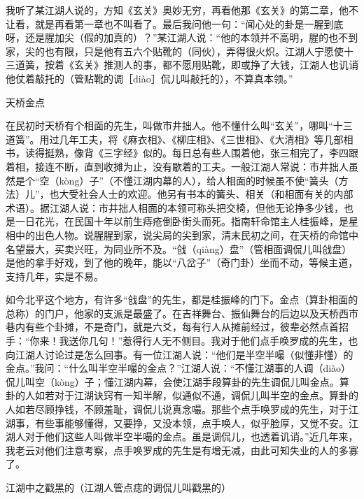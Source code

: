 \documentclass[12pt,UTF8]{ctexbook}
\begin{document}
我听了某江湖人说的，方知《玄关》奥妙无穷，再看他那《玄关》的第二章，他不让看，就是再看第一章也不叫看了。最后我问他一句：“闻心处的卦是一腥到底呀，还是腥加尖（假的加真的）？”某江湖人说：“他的本领并不高明，腥的也不到家，尖的也有限，只是他有五六个贴靴的（同伙），弄得很火炽。江湖人宁愿使十三道簧，按着《玄关》推测人的事，都不愿用贴靴，即或挣了大钱，江湖人也讥诮他仗着敲托的（管贴靴的调［diào］侃儿叫敲托的），不算真本领。”





天桥金点


在民初时天桥有个相面的先生，叫做市井拙人。他不懂什么叫“玄关”，哪叫“十三道簧”。用过几年工夫，将《麻衣相》、《柳庄相》、《三世相》、《大清相》等几部相书，读得挺熟，像背《三字经》似的。每日总有些人围着他，张三相完了，李四跟着相，接连不断，直到收摊为止，没有歇着的工夫。一般江湖人常说：市井拙人虽然是个“空（kòng）子”（不懂江湖内幕的人），给人相面的时候虽不使“簧头（方法）儿”，也大受社会人士的欢迎。他另有书本的簧头、相关（和相面有关的内部术语）。据江湖人说：市井拙人相面的本领可称头把交椅，但他无论挣多少钱，也是一日花光，在民国十年以前生痔疮倒卧街头而死。指南轩命馆主人桂振峰，是星相中的出色人物。说腥腥到家，说尖局的尖到家，清末民初之间，在天桥的命馆中名望最大，买卖兴旺，为同业所不及。“戗（qiàng）盘”（管相面调侃儿叫戗盘）是他的拿手好戏，到了他的晚年，能以“八岔子”（奇门卦）坐而不动，等候主道，支持几年，实是不易。

如今北平这个地方，有许多“戗盘”的先生，都是桂振峰的门下。金点（算卦相面的总称）的门户，他家的支派是最盛了。在吉祥舞台、振仙舞台的后边以及天桥西市巷内有些个卦摊，不是奇门，就是六爻，每有行人从摊前经过，彼辈必然点首招手：“你来！我送你几句！”惹得行人无不侧目。我对于他们点手唤罗成的先生，也向江湖人讨论过是怎么回事。有一位江湖人说：“他们是半空半嘬（似懂非懂）的金点。”我问：“什么叫半空半嘬的金点？”江湖人说：“不懂江湖事的人调（diào）侃儿叫空（kòng）子；懂江湖内幕，会使江湖手段算卦的先生调侃儿叫金点。算卦的人如若对于江湖诀窍有一知半解，似通似不通，调侃儿叫半空的金点。算卦的人如若尽顾挣钱，不顾羞耻，调侃儿说真念嘬。那些个点手唤罗成的先生，对于江湖事，有些事能够懂得，又要挣，又没本领，点手唤人，似乎脸厚，又觉不安。江湖人对于他们这些人叫做半空半嘬的金点。虽是调侃儿，也透着讥诮。”近几年来，我老云对他们注意考察，点手唤罗成的先生是有增无减，由此可知失业的人的多寡了。





江湖中之戳黑的（江湖人管点痣的调侃儿叫戳黑的）
\end{document}
